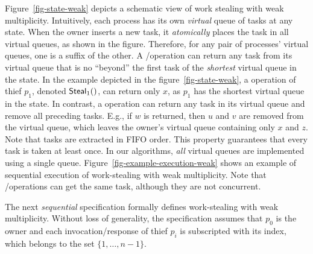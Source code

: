 Figure~\ref{fig-state-weak} depicts a schematic view of work stealing with weak multiplicity. Intuitively, each process has its own \emph{virtual} queue of tasks at any state. When the owner inserts a new task, it \emph{atomically} places the task in all virtual queues, as shown in the figure. Therefore, for any pair of processes' virtual queues, one is a suffix of the other. A \Take/\Steal operation can return any task from its virtual queue that is no ``beyond'' the first task of the \emph{shortest} virtual queue in the state. In the example depicted in the figure~\ref{fig-state-weak}, a \Steal operation of thief $p_1$, denoted ${\sf \small Steal}_1()$, can return only $x$, as $p_1$ has the shortest virtual queue in the state. In contrast, a \Take operation can return any task in its virtual queue and remove all preceding tasks. E.g., if $w$ is returned, then $u$ and $v$ are removed from the virtual queue, which leaves the owner's virtual queue containing only $x$ and $z$. Note that tasks are extracted in FIFO order. This property guarantees that every task is taken at least once. In our algorithms, \emph{all} virtual queues are implemented using a single queue. Figure~\ref{fig-example-execution-weak} shows an example of sequential execution of work-stealing with weak multiplicity. Note that \Take/\Steal operations can get the same task, although they are not concurrent.

The next \emph{sequential} specification formally defines work-stealing with weak multiplicity. Without loss of generality, the specification assumes that \(p_0\) is the owner and each invocation/response of thief \(p_i\) is subscripted with its index, which belongs to the set \(\{1, \hdots, n-1\}\).



